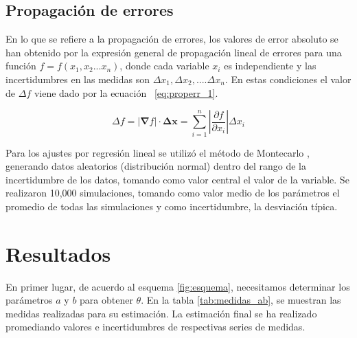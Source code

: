 \subsection{Propagación de errores}

En lo que se refiere a la propagación de errores, los valores de error absoluto se han obtenido por la expresión general de propagación lineal de errores para una función $f=f(x_1,x_2...x_n)$, donde cada variable $x_i$  es independiente y las incertidumbres en las medidas son $\Delta x_1, \Delta x_2,....\Delta x_n$. En estas condiciones el valor de $\Delta f$ viene dado por la ecuación ~\ref{eq:properr_1}. 


\begin{equation}\label{eq:properr_1}
	{\Delta f} = \left|\mathbf{\nabla}f\right|\cdot\mathbf{\Delta x} =  \sum_{i=1}^{n}\left|\frac{\partial f}{\partial x_i}\right|\Delta x_i
\end{equation}


\vspace{\baselineskip}
Para los ajustes por regresión lineal se utilizó el método de Montecarlo \cite{Anderson_montecarlo}, generando datos aleatorios (distribución normal) dentro del rango de la incertidumbre de los datos, tomando como valor central el valor de la  variable. Se realizaron 10,000 simulaciones, tomando como valor medio de los parámetros el promedio de todas las simulaciones y como incertidumbre, la desviación típica.

\section{Resultados}

En primer lugar, de acuerdo al esquema \ref{fig:esquema}, necesitamos determinar los parámetros $a$ y $b$ para obtener $\theta$. En la tabla \ref{tab:medidas_ab}, se muestran las  medidas realizadas para su estimación. La estimación final se ha realizado promediando valores e incertidumbres de respectivas series de medidas.


